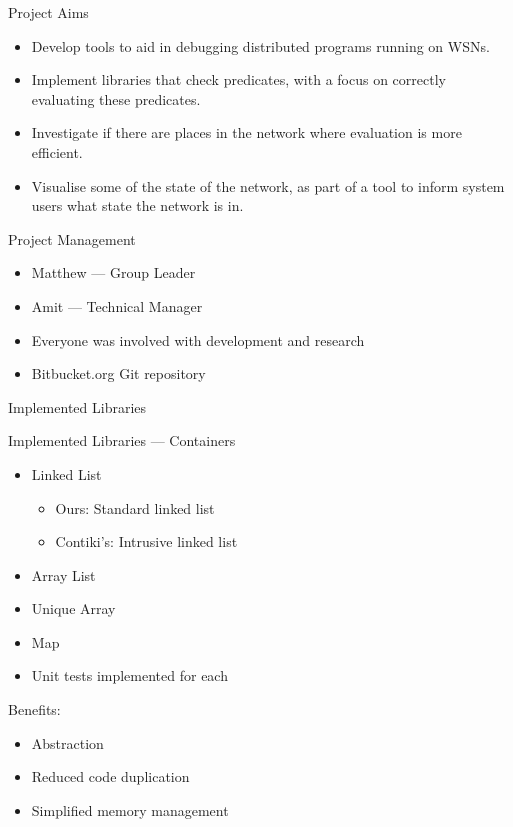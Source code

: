 \documentclass[usenames,dvipsnames]{beamer}
\newcommand{\subtitleframe}[1]{\begin{frame}\begin{block}{\centering\Large \vspace{1em} #1 \vspace{1em}}\end{block}\end{frame}}
\begin{document}
\begin{frame}{Project Aims}
	\begin{itemize}
		\item Develop tools to aid in debugging distributed programs running on WSNs.
		\item Implement libraries that check predicates, with a focus on correctly evaluating these predicates.
		\item Investigate if there are places in the network where evaluation is more efficient.
		\item Visualise some of the state of the network, as part of a tool to inform system users what state the network is in.
	\end{itemize}
\end{frame}

\begin{frame}{Project Management}
	\begin{itemize}
		\item Matthew --- Group Leader
		\item Amit --- Technical Manager
		\item Everyone was involved with development and research
		\item Bitbucket.org Git repository
	\end{itemize}
\end{frame}

\subtitleframe{Implemented Libraries}

\begin{frame}{Implemented Libraries --- Containers}
	\begin{itemize}
		\item Linked List
			\begin{itemize}
				\item Ours: Standard linked list
				\item Contiki's: Intrusive linked list
			\end{itemize}
		\item Array List
		\item Unique Array
		\item Map
		\item Unit tests implemented for each
	\end{itemize}
\vspace{1em}
Benefits:
	\begin{itemize}
		\item Abstraction
		\item Reduced code duplication
		\item Simplified memory management
	\end{itemize}
\end{frame}
\end{document}
